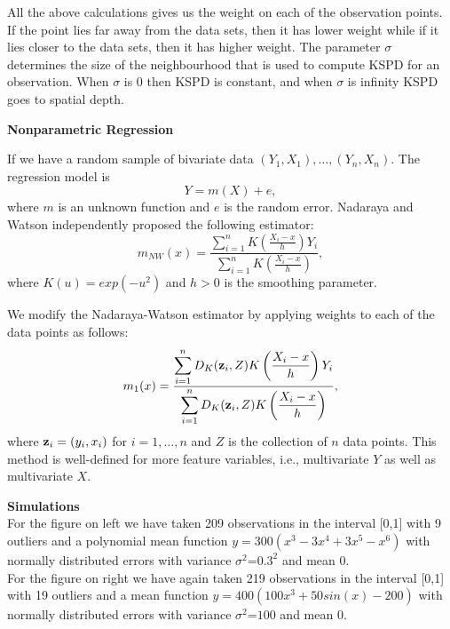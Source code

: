 \documentclass[11pt]{article}
\newcommand{\zvec}{\mbox{\bf z}}
\begin{document}
\begin{flushleft}
All the above calculations gives us the weight on each of the observation points. If the point lies far away from the data sets, then it has lower weight while if it lies closer to the data sets, then it has higher weight. 
The parameter $\sigma$ determines the size of the neighbourhood that is used to compute KSPD for an observation. When $\sigma$ is 0 then KSPD is constant, and when $\sigma$ is infinity KSPD goes to spatial depth.

\newpage
\vspace{0.1in}
\textbf{Nonparametric Regression}
\vspace{0.1in}

If we have a random sample of bivariate data $(Y_1,X_1),\ldots,(Y_n,X_n)$. The regression model is 
$$Y = m(X) + e,$$ 
where $m$ is an unknown function and $e$ is the random error. Nadaraya and Watson independently proposed the following estimator: 
$$m_{NW}(x)=\frac{\displaystyle{ \sum\limits_{i=1}^n K \left( \frac{X_i-x}{h} \right) Y_i}}{\displaystyle{ \sum\limits_{i=1}^n K \left( \frac{X_i-x}{h}\right )}},$$
where $K(u)=exp(-u^2)$ and $h>0$ is the smoothing parameter.

We modify the Nadaraya-Watson estimator by applying weights to each of the data points as follows:
$$m_{1}(x)= \frac{\displaystyle{ \sum\limits_{i=1}^n D_K(\zvec_i,Z) K\left( \frac{X_i-x}{h} \right) Y_i}}{\displaystyle{ \sum\limits_{i=1}^n D_K(\zvec_i,Z) K\left( \frac{X_i-x}{h}\right )}},$$
where $\zvec_i=(y_i,x_i)$ for $i=1,\ldots,n$ and $Z$ is the collection of $n$ data points. 
This method is well-defined for more feature variables, i.e., multivariate $Y$ as well as multivariate $X$.

\vspace{0.1in}
\textbf{Simulations}
\vspace{0.1in}
\\
For the figure on left we have taken 209 observations in the interval [0,1] with 9 outliers  and a polynomial mean function  $y=300(x^3-3x^4+3x^5-x^6)$ with normally distributed errors with variance $\sigma^2$=$0.3^2$ and mean 0.\\
For the figure on right we have again taken 219 observations in the interval [0,1] with 19 outliers  and a mean function
 $y=400(100x^3+50sin(x)-200)$  with normally distributed errors with variance $\sigma^2$=$100$ and mean 0.\\



\end{flushleft}
\end{document}
